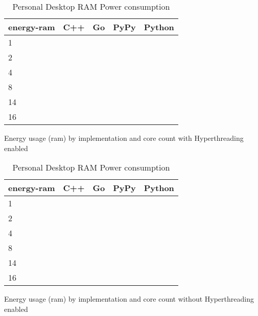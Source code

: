 \begin{table}[H]
    \centering
    \begin{tabular}{lrrrr}
        \hline
        energy-ram     & C++                 & Go          & PyPy       & Python              \\
        \hline
        1              &                     &             &            &                    \\
        2              &                     &             &            &                    \\
        4              &                     &             &            &                    \\
        8	           &                     &             &            &                    \\
        14             &                     &             &            &                    \\
        16             &                     &             &            &                    \\
        \hline
    \end{tabular}
\caption{Personal Desktop RAM Power consumption}{Energy usage (ram) by implementation and core count with Hyperthreading enabled}
\label{tab:desktop-energy-ram-hyperthreading}
\end{table}

\begin{table}[H]
    \centering
    \begin{tabular}{lrrrr}
        \hline
        energy-ram     & C++                 & Go          & PyPy       & Python              \\
        \hline
        1              &                     &             &            &                    \\
        2              &                     &             &            &                    \\
        4              &                     &             &            &                    \\
        8	           &                     &             &            &                    \\
        14             &                     &             &            &                    \\
        16             &                     &             &            &                    \\
        \hline
    \end{tabular}
\caption{Personal Desktop RAM Power consumption}{Energy usage (ram) by implementation and core count without Hyperthreading enabled}
\label{tab:desktop-energy-ram}
\end{table}

